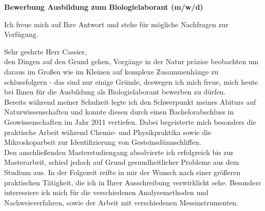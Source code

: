 \documentclass[11pt,a4paper,roman]{moderncv}
\begin{document}
\date{\today}
\opening{\textbf{Bewerbung Ausbildung zum Biologielaborant (m/w/d)
}}
\closing{Ich freue mich auf Ihre Antwort und stehe für mögliche Nachfragen zur Verfügung.}
\makelettertitle


Sehr geehrte Herr Cassier,\\
den Dingen auf den Grund gehen, Vorgänge in der Natur präzise beobachten um daraus im Großen wie im Kleinen auf komplexe Zusammenhänge zu schlussfolgern - das sind nur einige Gründe, deswegen ich mich freue, mich heute bei Ihnen für die Ausbildung als Biologielaborant bewerben zu dürfen.\\
\vspace{5mm}
Bereits während meiner Schulzeit legte ich den Schwerpunkt meines Abiturs auf Naturwissenschaften und konnte diesen durch einen Bachelorabschluss in Geowissenschaften im Jahr 2011 vertiefen. Dabei begeisterte mich besonders die praktische Arbeit während Chemie- und Physikpraktika sowie die Mikroskoparbeit zur Identifizierung von Gesteinsdünnschliffen.\\
Den anschließenden Masterstudiengang absolvierte ich erfolgreich bis zur Masterarbeit, schied jedoch auf Grund gesundheitlicher Probleme aus dem Studium aus. In der Folgezeit reifte in mir der Wunsch nach einer größeren praktischen Tätigkeit, die ich in Ihrer Ausschreibung verwirklicht sehe.
Besonders interessiere ich mich für die verschiedenen Analysemethoden und Nachweisverfahren, sowie der  Arbeit mit verschiedenen Messinstrumenten.\\
\vspace{5mm}
\end{document}
